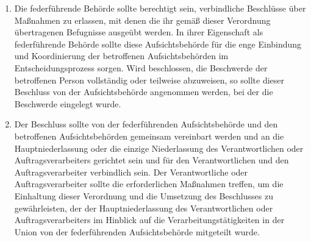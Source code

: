 \begin{enumerate}

   \item Die federführende Behörde sollte berechtigt sein, verbindliche Beschlüsse über Maßnahmen zu erlassen, mit denen
    die ihr gemäß dieser Verordnung übertragenen Befugnisse ausgeübt werden. In ihrer Eigenschaft als federführende
    Behörde sollte diese Aufsichtsbehörde für die enge Einbindung und Koordinierung der betroffenen Aufsichtsbehörden
    im Entscheidungsprozess sorgen. Wird beschlossen, die Beschwerde der betroffenen Person vollständig oder teilweise
    abzuweisen, so sollte dieser Beschluss von der Aufsichtsbehörde angenommen werden, bei der die Beschwerde eingelegt
    wurde.%
   \label{eg:125}
   

   \item Der Beschluss sollte von der federführenden Aufsichtsbehörde und den betroffenen Aufsichtsbehörden gemeinsam
    vereinbart werden und an die Hauptniederlassung oder die einzige Niederlassung des Verantwortlichen oder
    Auftragsverarbeiters gerichtet sein und für den Verantwortlichen und den Auftragsverarbeiter verbindlich sein. Der
    Verantwortliche oder Auftragsverarbeiter sollte die erforderlichen Maßnahmen treffen, um die Einhaltung dieser
    Verordnung und die Umsetzung des Beschlusses zu gewährleisten, der der Hauptniederlassung des Verantwortlichen oder
    Auftragsverarbeiters im Hinblick auf die Verarbeitungstätigkeiten in der Union von der federführenden
    Aufsichtsbehörde mitgeteilt wurde.%
   \label{eg:126}
   


\end{enumerate}
